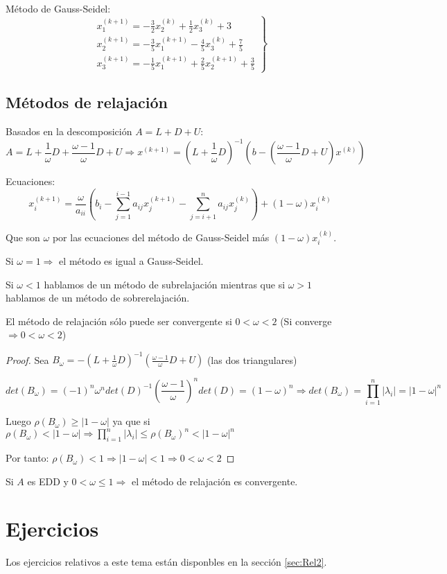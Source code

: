 \begin{ejemplo}
Método de Gauss-Seidel:
\begin{equation*}
    \left. \begin{array}{c}
        \displaystyle x_1^{(k+1)} = -\frac{3}{2} x_2^{(k)} + \frac{1}{2}x_3^{(k)} + 3 \\
        \displaystyle x_2^{(k+1)} = -\frac{3}{5}x_1^{(k+1)} - \frac{4}{5}x_3^{(k)} + \frac{7}{5} \\
        \displaystyle x_3^{(k+1)} = -\frac{1}{5}x_1^{(k+1)} + \frac{2}{5}x_2^{(k+1)} + \frac{3}{5}
    \end{array}\right\}
\end{equation*}

\end{ejemplo}

\subsection{Métodos de relajación}
Basados en la descomposición $A=L+D+U$:
$$A=L+\frac{1}{\omega}D+\frac{\omega-1}{\omega}D+U \Rightarrow x^{(k+1)}=\left(L+\frac{1}{\omega}D\right)^{-1}
    \left(b - (\frac{\omega-1}{\omega}D + U)x^{(k)}\right)$$

Ecuaciones:
$$x_i^{(k+1)} = \dfrac{\omega}{a_{ii}} \left(b_i - \sum_{j=1}^{i-1}a_{ij}x_j^{(k+1)} - \sum_{j=i+1}^n a_{ij}x_j^{(k)}\right) +
    (1-\omega)x_i^{(k)}$$

Que son $\omega$ por las ecuaciones del método de Gauss-Seidel más $(1-\omega)x_i^{(k)}$.

\noindent
Si $\omega=1 \Rightarrow$ el método es igual a Gauss-Seidel.

Si $\omega<1$ hablamos de un método de subrelajación mientras que si $\omega>1$ hablamos de un método de sobrerelajación.

\bigskip
\begin{teo}
    El método de relajación sólo puede ser convergente si $0<\omega<2$ (Si converge $\Rightarrow 0<\omega<2$)
\end{teo}
\begin{proof}
    Sea $B_\omega = -\left(L+\frac{1}{\omega}D\right)^{-1}\left(\frac{\omega-1}{\omega}D+U\right)$ (las dos triangulares)

    $$det(B_\omega) = (-1)^n \omega^n det(D)^{-1} \left(\frac{\omega-1}{\omega}\right)^n det(D) = (1-\omega)^n \Rightarrow
        det(B_\omega) = \prod_{i=1}^n |\lambda_i| = |1-\omega|^n$$

    Luego $\rho(B_\omega)\geq |1-\omega|$ ya que si $\rho(B_\omega)<|1-\omega| \Rightarrow \prod\limits_{i=1}^n |\lambda_i|\leq \rho(B_\omega)^n < |1-\omega|^n$

    Por tanto: $\rho(B_\omega)<1 \Rightarrow |1-\omega| <1 \Rightarrow 0<\omega<2$
\end{proof}

\begin{teo}
    Si $A$ es EDD y $0<\omega\leq 1 \Rightarrow$ el método de relajación es convergente.
\end{teo}


\section{Ejercicios}
Los ejercicios relativos a este tema están disponbles en la sección \ref{sec:Rel2}.